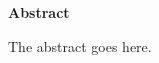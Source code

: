 \vspace*{\fill}

\begin{center}
    \textbf{Abstract}
\end{center}

The abstract goes here.

\vfill\cleardoublepage{}
